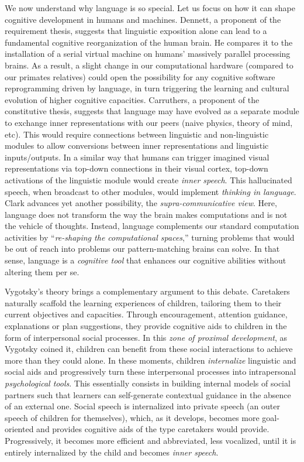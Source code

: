 We now understand why language is so special. Let us focus on how it can shape cognitive development in humans and machines. Dennett, a proponent of the requirement thesis, suggests that linguistic exposition alone can lead to a fundamental cognitive reorganization of the human brain.\cite{dennett_consciousness_1993} He compares it to the installation of a serial virtual machine on humans' massively parallel processing brains. As a result, a slight change in our computational hardware (\eg compared to our primates relatives) could open the possibility for any cognitive software reprogramming driven by language, in turn triggering the learning and cultural evolution of higher cognitive capacities.
Carruthers, a proponent of the constitutive thesis, suggests that language may have evolved as a separate module to exchange inner representations with our peers (naive physics, theory of mind, etc). This would require connections between linguistic and non-linguistic modules to allow conversions between inner representations and linguistic inputs/outputs. In a similar way that humans can trigger imagined visual representations via top-down connections in their visual cortex, top-down activations of the linguistic module would create \textit{inner speech}. This hallucinated speech, when broadcast to other modules, would implement \textit{thinking in language}.\cite{carruthers1998thinking} Clark advances yet another possibility, the \textit{supra-communicative view}. Here, language does not transform the way the brain makes computations and is not the vehicle of thoughts. Instead, language complements our standard computation activities by ``\textit{re-shaping the computational spaces},'' turning problems that would be out of reach into problems our pattern-matching brains can solve.\cite{carruthers_magic_1998} In that sense, language is a \textit{cognitive tool} that enhances our cognitive abilities without altering them per se. 

Vygotsky's theory brings a complementary argument to this debate. Caretakers naturally scaffold the learning experiences of children, tailoring them to their current objectives and capacities. Through encouragement, attention guidance, explanations or plan suggestions, they provide cognitive aids to children in the form of interpersonal social processes.\cite{vygotsky_thought_1934} In this \textit{zone of proximal development}, as Vygotsky coined it, children can benefit from these social interactions to achieve more than they could alone. In these moments, children \textit{internalize} linguistic and social aids and progressively turn these interpersonal processes into intrapersonal \textit{psychological tools}.\cite{vygotsky_thought_1934} This essentially consists in building internal models of social partners such that learners can self-generate contextual guidance in the absence of an external one. Social speech is internalized into private speech (an outer speech of children for themselves), which, as it develops, becomes more goal-oriented and provides cognitive aids of the type caretakers would provide.\cite{vygotsky_thought_1934,berk_why_1994} Progressively, it becomes more efficient and abbreviated, less vocalized, until it is entirely internalized by the child and becomes \textit{inner speech}. 

